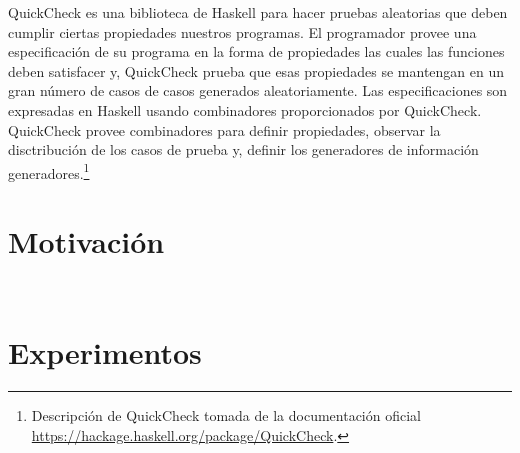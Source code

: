 QuickCheck es una biblioteca de Haskell para hacer pruebas aleatorias que deben cumplir ciertas
propiedades nuestros programas. El programador provee una especificación de su programa en la
forma de propiedades las cuales las funciones deben satisfacer y, QuickCheck prueba que esas
propiedades se mantengan en un gran número de casos de casos generados aleatoriamente. Las
especificaciones son expresadas en Haskell usando combinadores proporcionados por QuickCheck.
QuickCheck provee combinadores para definir propiedades, observar la disctribución de los casos
de prueba y, definir los generadores de información generadores.\footnote{
    Descripción de QuickCheck tomada de la documentación oficial
    \url{https://hackage.haskell.org/package/QuickCheck}.
}

\section{Motivación} %


\inputminted{haskell}{codigo/haskell/test-failure-function.hs}
\inputminted{haskell}{codigo/haskell/test-matching.hs}


\section{Experimentos} %
